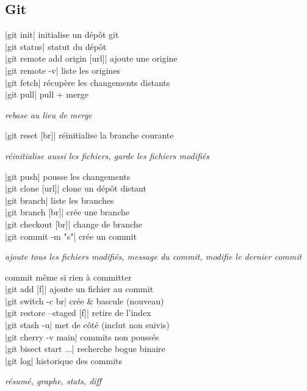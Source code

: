 \documentclass{article}
\newenvironment{cmdblock}{%
  \par\setlength{\parindent}{0pt}\setlength{\parskip}{0pt}%
  \RaggedRight%
}{\par}
\newlength{\cmdoptindent}
\newcommand{\cmdopt}[1]{%
  \hspace*{\cmdoptindent}%
  \begin{minipage}[t]{\dimexpr\linewidth-\cmdoptindent\relax}
    \RaggedRight \itshape #1%
  \end{minipage}\par
}
\begin{document}
\begin{multicols}{4}
    \section*{Git}
    \begin{cmdblock}
        \code|git init| \quad initialise un dépôt git \\
        \code|git status| \quad statut du dépôt \\
        \code|git remote add origin [url]| \quad ajoute une origine \\
        \code|git remote -v| \quad liste les origines \\
        \code|git fetch| \quad récupère les changements distants \\
        \code|git pull| \quad pull + merge \\
        \cmdopt{
             rebase au lieu de merge}
        \code|git reset [br]| \quad réinitialise la branche courante \\
        \cmdopt{ réinitialise aussi les fichiers,
            \codx{--soft} garde les fichiers modifiés}
        \code|git push| \quad pousse les changements \\
        \code|git clone [url]| \quad clone un dépôt distant \\
        \code|git branch| \quad liste les branches \\
        \code|git branch [br]| \quad crée une branche \\
        \code|git checkout [br]| \quad change de branche \\
        \code|git commit -m "s"| \quad crée un commit \\
        \cmdopt{ ajoute tous les fichiers modifiés,
            \codx{-m "msg"} message du commit,
            \codx{--amend} modifie le dernier commit}
             commit même si rien à committer \\
        \code|git add [f]| \quad ajoute un fichier au commit \\
        \code|git switch -c br| \quad crée \& bascule (nouveau) \\
        \code|git restore --staged [f]| \quad retire de l'index \\
        \code|git stash -u| \quad met de côté (inclut non suivis) \\
        \code|git cherry -v main| \quad commits non poussés \\
        \code|git bisect start ...| \quad recherche bogue binaire \\
        \code|git log| \quad historique des commits \\
        \cmdopt{ résumé,  graphe,
            \codx{--stat} stats, \codx{-p} diff}
    \end{cmdblock}


\end{multicols}
\end{document}
